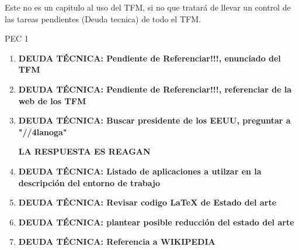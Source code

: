 
Este no es un capitulo al uso del TFM, si no que tratará de llevar un control de las tareas pendientes (Deuda tecnica) de todo el TFM.

PEC 1

\begin{enumerate}
    \item {\color{red}\textbf{DEUDA TÉCNICA: Pendiente de Referenciar!!!, enunciado del TFM}}
    \item {\color{red}\textbf{DEUDA TÉCNICA: Pendiente de Referenciar!!!, referenciar de la web de los TFM}}
    \item {\color{red}\textbf{DEUDA TÉCNICA: Buscar presidente de los EEUU, preguntar a "//4lanoga"}}
    
    {\color{red}\textbf{LA RESPUESTA ES REAGAN}}
    
    \item {\color{red}\textbf{DEUDA TÉCNICA: Listado de aplicaciones a utilzar en la descripción del entorno de trabajo}}
    \item {\color{red}\textbf{DEUDA TÉCNICA: Revisar codigo LaTeX de Estado del arte}}
    \item {\color{red}\textbf{DEUDA TÉCNICA: plantear posible reducción del estado del arte}}
    \item {\color{red}\textbf{DEUDA TÉCNICA: Referencia a WIKIPEDIA}}
    
\end{enumerate}